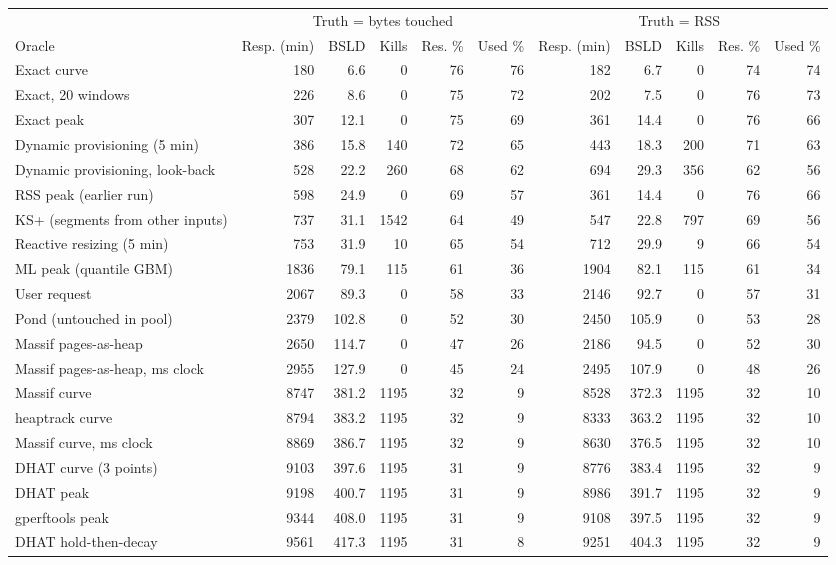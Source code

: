 \begin{tabular}{lrrrrrrrrrr}
\toprule
 & \multicolumn{5}{c}{Truth = bytes touched} & \multicolumn{5}{c}{Truth = RSS} \\
\cmidrule(lr){2-6} \cmidrule(lr){7-11}
Oracle & Resp. (min) & BSLD & Kills & Res. \% & Used \% & Resp. (min) & BSLD & Kills & Res. \% & Used \% \\
\midrule
Exact curve & 180 & 6.6 & 0 & 76 & 76 & 182 & 6.7 & 0 & 74 & 74 \\
Exact, 20 windows & 226 & 8.6 & 0 & 75 & 72 & 202 & 7.5 & 0 & 76 & 73 \\
Exact peak & 307 & 12.1 & 0 & 75 & 69 & 361 & 14.4 & 0 & 76 & 66 \\
Dynamic provisioning (5 min) & 386 & 15.8 & 140 & 72 & 65 & 443 & 18.3 & 200 & 71 & 63 \\
Dynamic provisioning, look-back & 528 & 22.2 & 260 & 68 & 62 & 694 & 29.3 & 356 & 62 & 56 \\
RSS peak (earlier run) & 598 & 24.9 & 0 & 69 & 57 & 361 & 14.4 & 0 & 76 & 66 \\
KS+ (segments from other inputs) & 737 & 31.1 & 1542 & 64 & 49 & 547 & 22.8 & 797 & 69 & 56 \\
Reactive resizing (5 min) & 753 & 31.9 & 10 & 65 & 54 & 712 & 29.9 & 9 & 66 & 54 \\
ML peak (quantile GBM) & 1836 & 79.1 & 115 & 61 & 36 & 1904 & 82.1 & 115 & 61 & 34 \\
User request & 2067 & 89.3 & 0 & 58 & 33 & 2146 & 92.7 & 0 & 57 & 31 \\
Pond (untouched in pool) & 2379 & 102.8 & 0 & 52 & 30 & 2450 & 105.9 & 0 & 53 & 28 \\
Massif pages-as-heap & 2650 & 114.7 & 0 & 47 & 26 & 2186 & 94.5 & 0 & 52 & 30 \\
Massif pages-as-heap, ms clock & 2955 & 127.9 & 0 & 45 & 24 & 2495 & 107.9 & 0 & 48 & 26 \\
Massif curve & 8747 & 381.2 & 1195 & 32 & 9 & 8528 & 372.3 & 1195 & 32 & 10 \\
heaptrack curve & 8794 & 383.2 & 1195 & 32 & 9 & 8333 & 363.2 & 1195 & 32 & 10 \\
Massif curve, ms clock & 8869 & 386.7 & 1195 & 32 & 9 & 8630 & 376.5 & 1195 & 32 & 10 \\
DHAT curve (3 points) & 9103 & 397.6 & 1195 & 31 & 9 & 8776 & 383.4 & 1195 & 32 & 9 \\
DHAT peak & 9198 & 400.7 & 1195 & 31 & 9 & 8986 & 391.7 & 1195 & 32 & 9 \\
gperftools peak & 9344 & 408.0 & 1195 & 31 & 9 & 9108 & 397.5 & 1195 & 32 & 9 \\
DHAT hold-then-decay & 9561 & 417.3 & 1195 & 31 & 8 & 9251 & 404.3 & 1195 & 32 & 9 \\
\bottomrule
\end{tabular}
